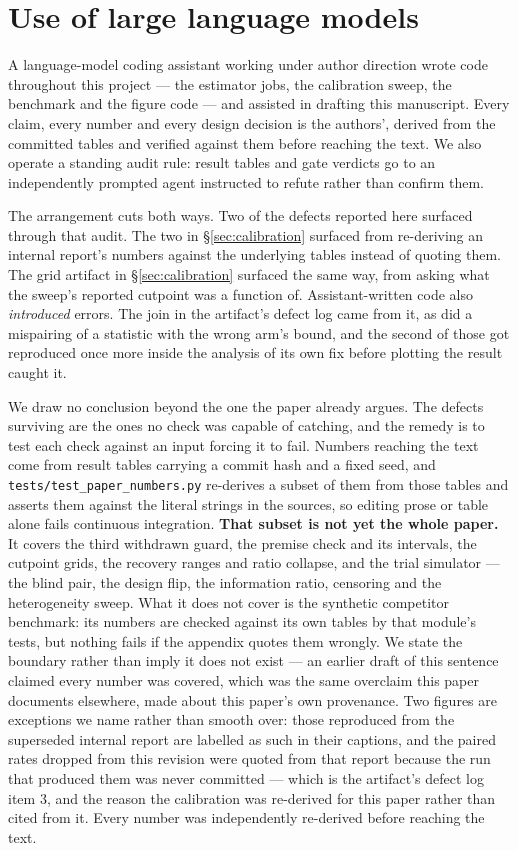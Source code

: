 \section{Use of large language models}
\label{app:llm}


A language-model coding assistant working under author direction wrote code
throughout this project --- the estimator jobs, the calibration sweep, the
benchmark and the figure code --- and assisted in drafting this manuscript.
Every claim, every number and every design decision is the authors', derived
from the committed tables and verified against them before reaching the text.
We also operate a standing audit rule: result tables and gate verdicts go to an
independently prompted agent instructed to refute rather than confirm them.

The arrangement cuts both ways. Two of the defects reported here surfaced through
that audit. The two in \S\ref{sec:calibration} surfaced from re-deriving an
internal report's numbers against the underlying tables instead of quoting them.
The grid artifact in \S\ref{sec:calibration} surfaced the same way, from asking
what the sweep's reported cutpoint was a function of. Assistant-written code also
\emph{introduced} errors. The join in the artifact's defect log came from it,
as did a mispairing of a statistic with the wrong arm's bound, and the second of
those got reproduced once more inside the analysis of its own fix before plotting
the result caught it.

We draw no conclusion beyond the one the paper already argues. The defects
surviving are the ones no check was capable of catching, and the remedy is to
test each check against an input forcing it to fail. 
Numbers reaching the text come from result tables carrying a commit hash and a
fixed seed, and \texttt{tests/test\_paper\_numbers.py} re-derives a subset of
them from those tables and asserts them against the literal strings in the
sources, so editing prose or table alone fails continuous integration. \textbf{That
subset is not yet the whole paper.} It covers the third withdrawn guard, the
premise check and its intervals, the cutpoint grids, the recovery ranges and
ratio collapse, and the trial simulator --- the blind pair, the design flip, the
information ratio, censoring and the heterogeneity sweep. What it does not cover
is the synthetic competitor benchmark: its numbers are checked against its own
tables by that module's tests, but nothing fails if the appendix quotes them
wrongly. We state the boundary
rather than imply it does not exist --- an earlier draft of this sentence
claimed every number was covered, which was the same overclaim this paper
documents elsewhere, made about this paper's own provenance. Two figures are
exceptions we name rather than smooth over: those reproduced
from the superseded internal report are labelled as such in their captions, and
the paired rates dropped from this revision were quoted from that
report because the run that produced them was never committed --- which is
the artifact's defect log item 3, and the reason the calibration was re-derived
for this paper rather than cited from it. Every number was independently
re-derived before reaching the text.
